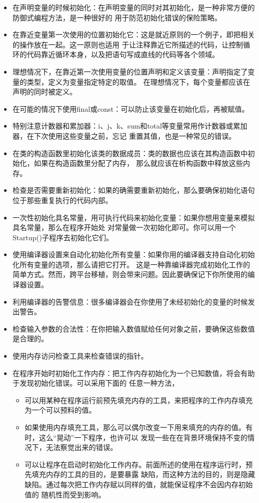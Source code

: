 \documentclass{article}
\begin{document}
\begin{itemize}
    \item 在声明变量的时候初始化：在声明变量的同时对其初始化，是一种非常方便的防御式编程方法，是一种很好的
    用于防范初始化错误的保险策略。
    \item 在靠近变量第一次使用的位置初始化它：这是就近原则的一个例子，即把相关的操作放在一起。这一原则也适用
    于让注释靠近它所描述的代码，让控制循环的代码靠近循环本身，以及把语句写成直线的代码等各个领域。
    \item 理想情况下，在靠近第一次使用变量的位置声明和定义该变量：声明指定了变量的类型，定义为变量指定特定的取值。
    在理想情况下，每个变量都应该在声明的同时被定义。
    \item 在可能的情况下使用final或const：可以防止该变量在初始化后，再被赋值。
    \item 特别注意计数器和累加器：i、j、k、sum和total等变量常用作计数器或累加器，在下次使用这些变量之前，忘记
    重置其值，也是一种常见的错误。
    \item 在类的构造函数里初始化该类的数据成员：类的数据也应该在其构造函数中初始化，如果在构造函数里分配了内存，
    那么就应该在析构函数中释放这些内存。
    \item 检查是否需要重新初始化：如果的确需要重新初始化，那么要确保初始化语句位于那些重复执行的代码内部。
    \item 一次性初始化具名常量，用可执行代码来初始化变量：如果你想用变量来模拟具名常量，那么在程序开始处
    对常量做一次初始化即可。你可以用一个Startup()子程序去初始化它们。
    \item 使用编译器设置来自动化初始化所有变量：如果你用的编译器支持自动化初始化所有变量的选项，那么请把它打开。
    这是一种靠编译器完成初始化工作的简单方式。然而，跨平台移植，则会带来问题。因此要确保记下你所使用的编译器设置。
    \item 利用编译器的告警信息：很多编译器会在你使用了未经初始化的变量的时候发出警告。
    \item 检查输入参数的合法性：在你把输入数值赋给任何对象之前，要确保这些数值是合理的。
    \item 使用内存访问检查工具来检查错误的指针。
    \item 在程序开始时初始化工作内存：把工作内存初始化为一个已知数值，将会有助于发现初始化错误。可以采用下面的
    任意一种方法，
    \begin{itemize}
        \item 可以用某种在程序运行前预先填充内存的工具，来把程序的工作内存填充为一个可以预料的值。
        \item 如果使用内存填充工具，那么可以偶尔改变一下用来填充的内存的值。有时，这么“晃动”一下程序，也许可以
        发现一些在在背景环境保持不变的情况下，无法察觉出来的错误。
        \item 可以让程序在启动时初始化工作内存。前面所述的使用在程序运行时，预先填充内存的工具的目的，是要暴露
        缺陷，而这种方法的目的，则是隐藏缺陷。通过每次把工作内存赋以同样的值，就能保证程序不会因内存初始值的
        随机性而受到影响。
    \end{itemize}
\end{itemize}
\end{document}

